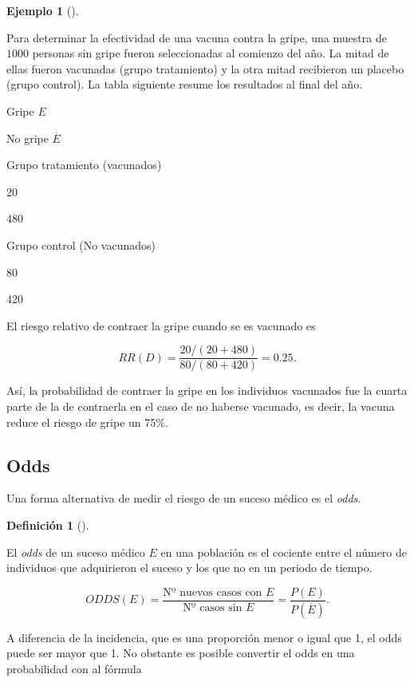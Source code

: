 \documentclass[
  a4paper,
]{scrreport}
\theoremstyle{plain}
\theoremstyle{definition}
\newtheorem{definition}{Definición}[chapter]
\theoremstyle{definition}
\newtheorem{example}{Ejemplo}[chapter]
\theoremstyle{remark}
\begin{document}
\begin{example}[]\protect\hypertarget{exm-riesgo-relativo}{}\label{exm-riesgo-relativo}

Para determinar la efectividad de una vacuna contra la gripe, una
muestra de \(1000\) personas sin gripe fueron seleccionadas al comienzo
del año. La mitad de ellas fueron vacunadas (grupo tratamiento) y la
otra mitad recibieron un placebo (grupo control). La tabla siguiente
resume los resultados al final del año.

Gripe \(E\)

No gripe \(\overline E\)

Grupo tratamiento (vacunados)

20

480

Grupo control (No vacunados)

80

420

El riesgo relativo de contraer la gripe cuando se es vacunado es

\[RR(D) = \frac{20/(20+480)}{80/(80+420)} = 0.25.\]

Así, la probabilidad de contraer la gripe en los individuos vacunados
fue la cuarta parte de la de contraerla en el caso de no haberse
vacunado, es decir, la vacuna reduce el riesgo de gripe un 75\%.

\end{example}

\subsection{Odds}\label{odds}

Una forma alternativa de medir el riesgo de un suceso médico es el
\emph{odds}.

\begin{definition}[]\protect\hypertarget{def-odds}{}\label{def-odds}

El \emph{odds} de un suceso médico \(E\) en una población es el cociente
entre el número de individuos que adquirieron el suceso y los que no en
un periodo de tiempo.

\[ODDS(E)=\frac{\mbox{Nº nuevos casos con $E$}}{\mbox{Nº casos sin $E$}}=\frac{P(E)}{P(\overline E)}.\]

\end{definition}

A diferencia de la incidencia, que es una proporción menor o igual que
1, el odds puede ser mayor que 1. No obstante es posible convertir el
odds en una probabilidad con al fórmula
\end{document}
